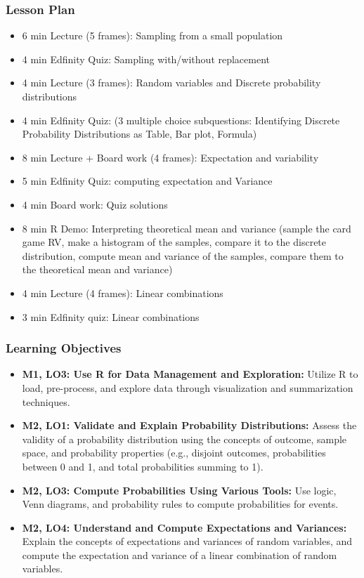 \begin{frame}
    \frametitle{Lesson Plan}
    \begin{itemize}
        \item 6 min Lecture (5 frames): Sampling from a small population
        \item 4 min Edfinity Quiz: Sampling with/without replacement
        \item 4 min Lecture (3 frames): Random variables and Discrete probability distributions
        \item 4 min Edfinity Quiz: (3 multiple choice subquestions: Identifying Discrete Probability Distributions as Table, Bar plot, Formula)
        \item 8 min Lecture + Board work (4 frames): Expectation and variability
        \item 5 min Edfinity Quiz: computing expectation and Variance
        \item 4 min Board work: Quiz solutions
        \item 8 min R Demo: Interpreting theoretical mean and variance (sample the card game RV, make a histogram of the samples, compare it to the discrete distribution, compute mean and variance of the samples, compare them to the theoretical mean and variance)
        \item 4 min Lecture (4 frames): Linear combinations
        \item 3 min Edfinity quiz: Linear combinations
   \end{itemize}
\end{frame}

\begin{frame}
    \frametitle{Learning Objectives}
    \begin{itemize}
        \item \textbf{M1, LO3: Use R for Data Management and Exploration:} Utilize R to load, pre-process, and explore data through visualization and summarization techniques.
        \item \textbf{M2, LO1: Validate and Explain Probability Distributions:} Assess the validity of a probability distribution using the concepts of outcome, sample space, and probability properties (e.g., disjoint outcomes, probabilities between 0 and 1, and total probabilities summing to 1).
        \item \textbf{M2, LO3: Compute Probabilities Using Various Tools:} Use logic, Venn diagrams, and probability rules to compute probabilities for events.
        \item \textbf{M2, LO4: Understand and Compute Expectations and Variances:} Explain the concepts of expectations and variances of random variables, and compute the expectation and variance of a linear combination of random variables.
    \end{itemize}
\end{frame}

